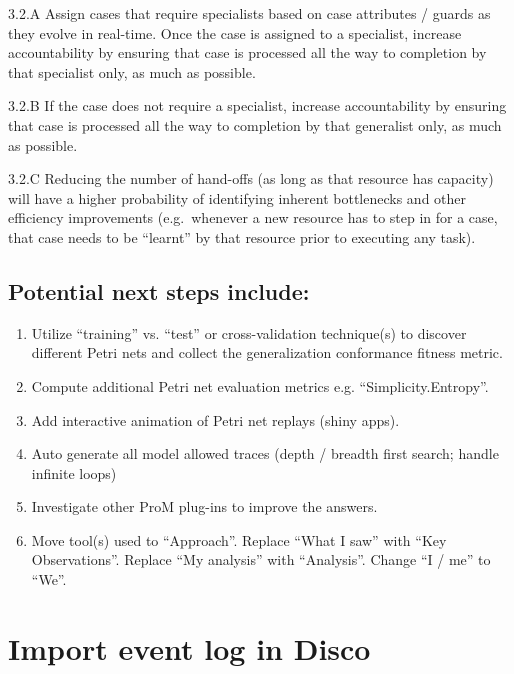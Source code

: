 \documentclass[]{article}
\begin{document}
\begin{enumerate}
  3.2.A Assign cases that require specialists based on case attributes /
  guards as they evolve in real-time. Once the case is assigned to a
  specialist, increase accountability by ensuring that case is processed
  all the way to completion by that specialist only, as much as
  possible.

  3.2.B If the case does not require a specialist, increase
  accountability by ensuring that case is processed all the way to
  completion by that generalist only, as much as possible.

  3.2.C Reducing the number of hand-offs (as long as that resource has
  capacity) will have a higher probability of identifying inherent
  bottlenecks and other efficiency improvements (e.g.~whenever a new
  resource has to step in for a case, that case needs to be ``learnt''
  by that resource prior to executing any task).
\end{enumerate}

\subsection{Potential next steps
include:}\label{potential-next-steps-include}

\begin{enumerate}
\def\labelenumi{\arabic{enumi}.}
\itemsep1pt\parskip0pt
\item
  Utilize ``training'' vs. ``test'' or cross-validation technique(s) to
  discover different Petri nets and collect the generalization
  conformance fitness metric.
\item
  Compute additional Petri net evaluation metrics e.g.
  ``Simplicity.Entropy''.
\item
  Add interactive animation of Petri net replays (shiny apps).
\item
  Auto generate all model allowed traces (depth / breadth first search;
  handle infinite loops)
\item
  Investigate other ProM plug-ins to improve the answers.
\item
  Move tool(s) used to ``Approach''. Replace ``What I saw'' with ``Key
  Observations''. Replace ``My analysis'' with ``Analysis''. Change ``I
  / me'' to ``We''.
\end{enumerate}

\section{Import event log in Disco}\label{import-event-log-in-disco}
\end{document}
